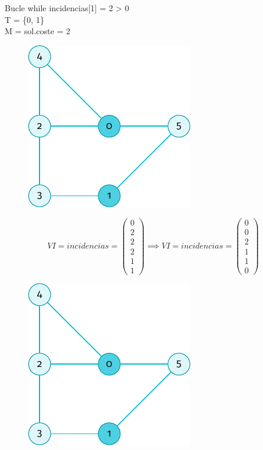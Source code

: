\documentclass[spanish]{beamer}
\begin{document}
\begin{frame}{Bucle while}
	incidencias[1] = 2 > 0\\
	T = \{0, 1\}\\
	M = sol.coste = 2
	\begin{figure}[H]
		\centering \includegraphics{./img/grafo-ejemplo-2.pdf}
	\end{figure}	
\end{frame}

\begin{frame}{}
	$$  VI = incidencias = 
	\begin{pmatrix}
	  0 \\
	  2 \\
	  2 \\
	  2 \\
	  1 \\
	  1
	\end{pmatrix} \implies  VI = incidencias = 
	\begin{pmatrix}	
	  0 \\
	  0 \\
	  2 \\
	  1 \\
	  1 \\
	  0
	\end{pmatrix}$$
	\begin{figure}[H]
		\centering \includegraphics{./img/grafo-ejemplo-2.pdf}
	\end{figure}
\end{frame}
\end{document}
